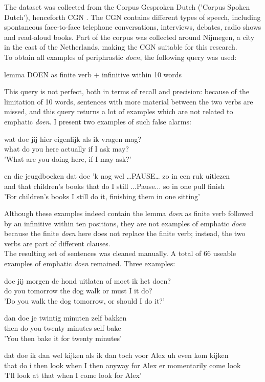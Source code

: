 \documentclass[12pt]{article}
\begin{document}
The dataset was collected from the Corpus Gesproken Dutch ('Corpus Spoken Dutch'), henceforth CGN \citep{cgn}. The CGN contains different types of speech, including spontaneous face-to-face telephone conversations, interviews, debates, radio shows and read-aloud books. Part of the corpus was collected around Nijmegen, a city in the east of the Netherlands, making the CGN suitable for this research.\\\indent
To obtain all examples of periphrastic \emph{doen}, the following query was used:

\begin{exe}
\ex lemma DOEN as finite verb + infinitive within 10 words
\end{exe}

This query is not perfect, both in terms of recall and precision: because of the limitation of 10 words, sentences with more material between the two verbs are missed, and this query returns a lot of examples which are not related to emphatic \emph{doen}. I present two examples of such false alarms:

\begin{exe}
\ex \gll wat doe jij hier eigenlijk als ik vragen mag? \\
what do you here actually if I ask may?\\
\trans 'What are you doing here, if I may ask?'

\ex \gll en die jeugdboeken dat doe 'k {nog wel} …PAUSE… zo in een ruk uitlezen \\
and that {children's books} that do I still ...Pause... so in one pull finish\\
\trans 'For children's books I still do it, finishing them in one sitting'
\end{exe}

Although these examples indeed contain the lemma \emph{doen} as finite verb followed by an infinitive within ten positions, they are not examples of emphatic \emph{doen} because the finite \emph{doen} here does not replace the finite verb; instead, the two verbs are part of different clauses.\\\indent
The resulting set of sentences was cleaned manually. A total of 66 useable examples of emphatic \emph{doen} remained. Three examples:

\begin{exe} 
\ex \gll doe jij morgen de hond uitlaten of moet ik het doen? \\ \label{hond}
do you tomorrow the dog walk or must I it do?\\
\trans 'Do you walk the dog tomorrow, or should I do it?'

\ex \gll dan doe je twintig minuten zelf bakken \\
then do you twenty minutes self bake\\
\trans 'You then bake it for twenty minutes'

\ex \gll dat doe ik {dan wel} kijken als ik dan toch voor Alex uh even kom kijken \\ \label{Alex}
that do i then look when I then anyway for Alex er momentarily come look\\
\trans 'I'll look at that when I come look for Alex'
\end{exe}
\end{document}
